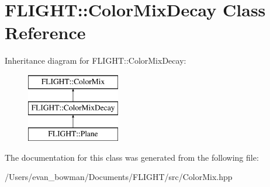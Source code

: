 \hypertarget{class_f_l_i_g_h_t_1_1_color_mix_decay}{}\section{F\+L\+I\+G\+HT\+:\+:Color\+Mix\+Decay Class Reference}
\label{class_f_l_i_g_h_t_1_1_color_mix_decay}
Inheritance diagram for F\+L\+I\+G\+HT\+:\+:Color\+Mix\+Decay\+:\begin{figure}[H]
\begin{center}
\leavevmode
\includegraphics[height=3.000000cm]{class_f_l_i_g_h_t_1_1_color_mix_decay}
\end{center}
\end{figure}


The documentation for this class was generated from the following file\+:\begin{DoxyCompactItemize}
\item 
/\+Users/evan\+\_\+bowman/\+Documents/\+F\+L\+I\+G\+H\+T/src/Color\+Mix.\+hpp\end{DoxyCompactItemize}
